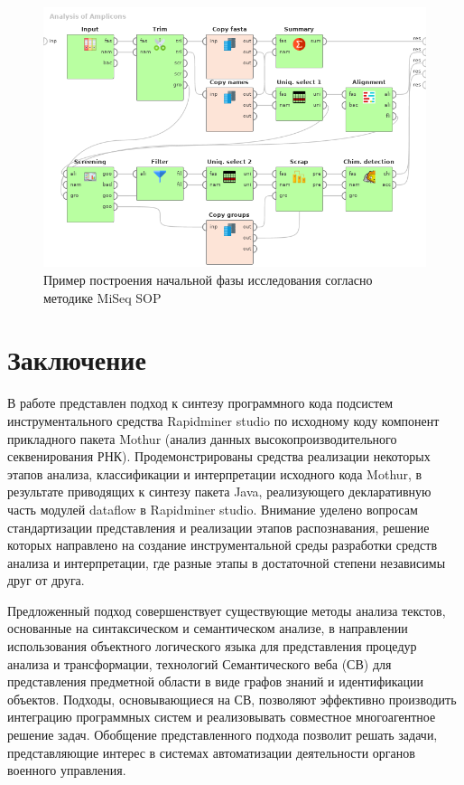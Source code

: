 \documentclass[12pt]{article}
\begin{document}
\begin{figure}
  \centering
   \includegraphics[width=0.8\linewidth]{Dataflow-color-en.png}
  \caption{Пример построения начальной фазы исследования согласно методике MiSeq SOP}
  \label{fig:ex}
\end{figure}

\section*{Заключение}

В работе представлен подход к синтезу программного кода подсистем инструментального средства Rapidminer studio по исходному коду компонент прикладного пакета Mothur (анализ данных высокопроизводительного секвенирования РНК). Продемонстрированы средства реализации некоторых этапов анализа, классификации и интерпретации исходного кода Mothur, в результате приводящих к синтезу пакета Java, реализующего декларативную часть модулей dataflow в Rapidminer studio. Внимание уделено вопросам стандартизации представления и реализации этапов распознавания, решение которых направлено на создание инструментальной среды разработки средств анализа и интерпретации, где разные этапы в достаточной степени независимы друг от друга.

Предложенный подход совершенствует существующие методы анализа текстов, основанные на синтаксическом и семантическом анализе, в направлении использования объектного логического языка для представления процедур анализа и трансформации, технологий Семантического веба (СВ) для представления предметной области в виде графов знаний и идентификации объектов.  Подходы, основывающиеся на СВ, позволяют эффективно производить интеграцию программных систем и реализовывать совместное многоагентное решение задач.  Обобщение представленного подхода позволит решать задачи, представляющие
интерес в системах автоматизации деятельности органов военного управления.
\end{document}
